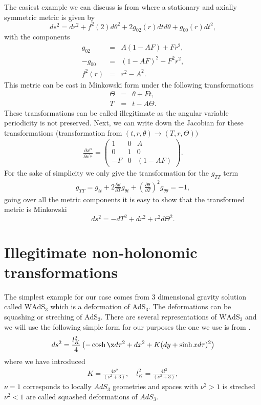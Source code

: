 \documentclass[preprint,aps,tightenlines,showkeys,nofootinbib,superscriptaddress,amsmath]{revtex4}
\begin{document}
The easiest example we can discuss is from \cite{Deser:1985pk} where a
stationary and axially symmetric metric is given by
\begin{equation}
  ds^{2}= dr^{2}+f^{2}(2)d \theta^{2}+2g_{02}(r)dt d\theta +g_{00}(r)dt^{2},
\end{equation}
with the components
\begin{eqnarray}
  g_{02}& = &A(1-AF)+Fr^{2},\\
  -g_{00}& =&(1-AF)^{2}-F^{2}r^{2},\\
  f^{2}(r)&=&r^{2}-A^{2}.
\end{eqnarray}
This metric can be cast in Minkowski form under the following transformations
\begin{eqnarray}
  \Theta &=&\theta+Ft,\\
  T &=&t-A\Theta.
\end{eqnarray}
These transformations can be called illegitimate as the angular
variable periodicity is not preserved. Next, we can write down the
Jacobian for these transformations (transformation from
$(t,r,\theta)\rightarrow (T,r,\Theta))$
\begin{eqnarray}
  \frac{\partial x^{\alpha} }{\partial x^{\prime\mu} }=
  \begin{pmatrix}
    1 & 0 & A \\
    0 & 1 & 0 \\
    -F & 0 & (1-AF)
  \end{pmatrix}.
\end{eqnarray}
For the sake of simplicity we only give the transformation for the $g_{TT}$ term
\begin{eqnarray}
  g_{TT}=g_{tt}+2 \frac{\partial\theta}{\partial T} g_{\theta
  t}+\left(\frac{\partial\theta}{\partial T}\right)^{2}g_{\theta \theta }=-1,
\end{eqnarray}
going over all the metric components it is easy to show that the
transformed metric is Minkowski
\begin{equation}
  ds^{2}=-dT^{2}+ dr^{2}+r^{2}d\Theta^{2}.
\end{equation}
\section{Illegitimate non-holonomic transformations}
The simplest example for our case comes from 3 dimensional gravity
solution called $\text{WAdS}_{3}$ which is a deformation of
$\text{AdS}_3$. The deformations can be squashing or streching of
$\text{AdS}_3$. There are several representations of
$\text{WAdS}_{3}$ and we will use the following simple form for our purposes
the one we use is from \cite{Giribet:2015lfa}.
\begin{equation}
  ds^{2}=\dfrac{l^{2}_K}{4}\left(-\cosh\x d\tau^{2}+dx^{2}+K(dy+\sinh
  x d\tau )^{2}   \right)\label{warpedads}
\end{equation}
where we have introduced
\begin{eqnarray}
  K=\frac{4\nu^{2}}{(\nu ^{2}+3 )},\quad l_{K}^{2}=\frac{4l^{2}
  }{(\nu ^{2}+3 )},
\end{eqnarray}
$\nu =1$ corresponds to locally $AdS_3$ geometries and spaces with
$\nu ^{2}>1$ is streched $\nu ^{2}<1$ are called squashed
deformations of $AdS_3$.
\end{document}
